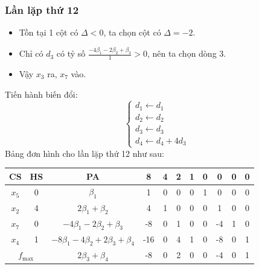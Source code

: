 \documentclass[12pt]{article}
\begin{document}
\subsubsection{Lần lặp thứ 12}
\begin{itemize}
\item Tồn tại 1 cột có $\Delta < 0$, ta chọn cột có $\Delta = -2$.
\item Chỉ có $d_3$ có tỷ số $\displaystyle \frac{-4\beta_1 - 2\beta_2 + \beta_3}{1} > 0$, nên ta chọn dòng 3.
\item Vậy $x_3$ ra, $x_7$ vào.
\end{itemize}
Tiến hành biến đổi:
$$
\left\{
\begin{array}{lll}
d_1 \leftarrow d_1 \\
d_2 \leftarrow d_2\\
d_3 \leftarrow d_3\\
d_4 \leftarrow d_4 + 4d_3
\end{array}
\right.
$$
Bảng đơn hình cho lần lặp thứ 12 như sau:
\begin{table}[H]
\centering
\begin{tabular}{|c|c|c|c|c|c|c|c|c|c|c|}
\hline
CS & HS & PA & 8 & 4 & 2 & 1 & 0 & 0 & 0 & 0 \\
\hline
$x_5$ & 0 & $\beta_1$ & 1 & 0 & 0 & 0 & 1 & 0 & 0 & 0 \\
$x_2$ & 4 & $2\beta_1 + \beta_2$ & 4 & 1 & 0 & 0 & 0 & 1 & 0 & 0 \\
$x_7$ & 0 & $-4\beta_1 - 2\beta_2 + \beta_3$ & -8 & 0 & 1 & 0 & 0 & -4 & 1 & 0 \\
$x_4$ & 1 & $-8\beta_1 - 4\beta_2 + 2\beta_3 + \beta_4$ & -16 & 0 & 4 & 1 & 0 & -8 & 0 & 1 \\
\hline
\multicolumn{2}{|c|}{$f_{\max}$}
& $2\beta_3 + \beta_4$ & -8 & 0 & 2 & 0 & 0 & -4 & 0 & 1 \\
\hline
\end{tabular}
\end{table}
\end{document}
